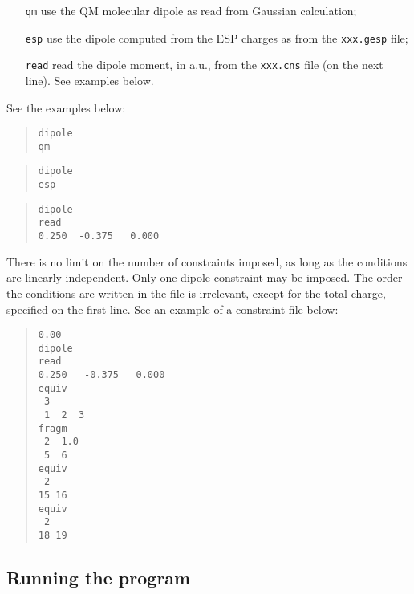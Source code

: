 \documentclass[a4paper]{report}
\begin{document}
\begin{itemize}
\begin{itemize}
\item[\texttt{qm}] use the QM molecular dipole as read from Gaussian calculation;
\item[\texttt{esp}] use the dipole computed from the ESP charges as from the \texttt{xxx.gesp} file; 
\item[\texttt{read}] read the dipole moment, in a.u., from the \texttt{xxx.cns} file (on the next line). See examples below.
\end{itemize}
See the examples below:
\begin{framed}
\begin{quote}
\begin{verbatim}
dipole 
qm
\end{verbatim}
\end{quote}
\end{framed}
\begin{framed}
\begin{quote}
\begin{verbatim}
dipole 
esp
\end{verbatim}
\end{quote}
\end{framed}
\begin{framed}
\begin{quote}
\begin{verbatim}
dipole 
read
0.250  -0.375   0.000
\end{verbatim}
\end{quote}
\end{framed}

\end{itemize}

There is no limit on the number of constraints imposed, as long as the conditions are
linearly independent. Only one dipole constraint may be imposed. The order the
conditions are written in the file is irrelevant, except for the total charge,
specified on the first line. See an example of a constraint file below:
\begin{framed}
\begin{quote}
\begin{verbatim}
0.00
dipole
read
0.250   -0.375   0.000
equiv
 3
 1  2  3
fragm
 2  1.0
 5  6
equiv
 2
15 16
equiv
 2
18 19
\end{verbatim}
\end{quote}
\end{framed}

\subsection*{Running the program}
\end{document}
